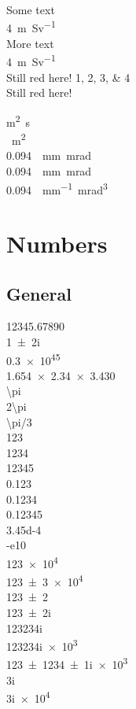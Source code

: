 \documentclass{article}
\begin{document}
{
\color{red}
Some text \\
\SI{4}{\metre\per\sievert} \\
More text \\
\SI[color = blue]{4}{\metre\per\sievert} \\
Still red here!
\numlist[color = blue]{1;2;3;4}\\
Still red here!\\
}

\si{m^2.s}\\
\si{\mu m^2}\\

\SI{0.094}{\pi . \milli\meter . \milli\radian}\\

\SI{0.094}{ . \milli\meter . \milli\radian}\\

\SI{0.094}{\pi \per \milli\meter . \milli\radian\tothe{3}}\\
\section{Numbers}
\subsection{General}
\num{12345,67890}\\
\num{1+-2i}\\
\num{.3e45}\\
\num{1.654 x 2.34 x 3.430}\\
\num{\pi}\\
\num{2\pi}\\
\num{\pi/3}\\

\num{123}\\
\num{1234}\\
\num{12345}\\
\num{0.123}\\
\num{0,1234}\\
\num{.12345}\\
\num{3.45d-4}\\
\num{-e10}\\

\num{123e4}\\
\num{123(3)e4}\\

\num{123\pm2}\\
\num{123\pm2i}\\
\num{123+234i}\\
\num{123+234ie3}\\
\num{123(1)+234(1)ie3}\\
\num{+3i}\\
\num{+3ie4}\\
\end{document}

